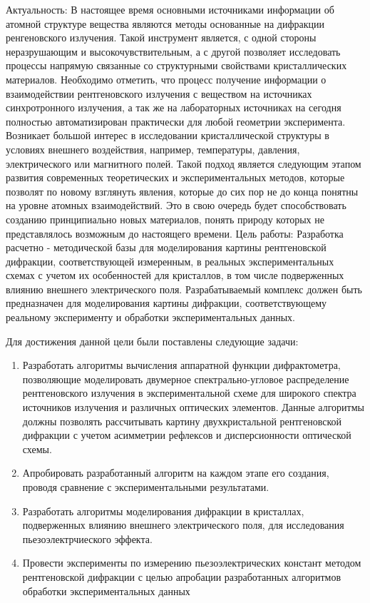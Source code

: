 
Актуальность:
  В настоящее время основными источниками информации об атомной структуре
  вещества являются методы основанные на дифракции ренгеновского излучения.
  Такой инструмент является, с одной стороны неразрушающим и высокочувствительным,
   а с другой позволяет исследовать процессы напрямую связанные со структурными
   свойствами кристаллических материалов. Необходимо отметить, что процесс
   получение информации о взаимодействии рентгеновского излучения с веществом на
   источниках синхротронного излучения, а так же на лабораторных источниках на
   сегодня полностью автоматизирован практически для любой геометрии эксперимента.
    Возникает большой интерес в исследовании кристаллической структуры в условиях
     внешнего воздействия, например, температуры, давления, электрического или
     магнитного полей.  Такой подход является следующим этапом развития современных
     теоретических и экспериментальных методов, которые позволят по новому взглянуть
     явления, которые до сих пор не до конца понятны на уровне атомных взаимодействий.
      Это в свою очередь будет способствовать созданию принципиально новых материалов,
       понять природу которых не представлялось возможным до настоящего времени.
Цель работы:
  Разработка расчетно - методической базы для моделирования картины рентгеновской
  дифракции, соответствующей измеренным, в реальных экспериментальных схемах
  с учетом их особенностей для кристаллов, в том числе подверженных влиянию
  внешнего электрического поля. Разрабатываемый комплекс должен быть предназначен
  для моделирования картины дифракции, соответствующему реальному эксперименту
  и обработки экспериментальных данных.

Для достижения данной цели были поставлены следующие задачи:
\begin{enumerate}
\item Разработать алгоритмы вычисления аппаратной функции дифрактометра, позволяющие моделировать
двумерное спектрально-угловое распределение рентгеновского излучения в экспериментальной схеме
для широкого спектра источников излучения и различных оптических элементов.
Данные алгоритмы должны позволять рассчитывать картину двухкристальной рентгеновской дифракции с учетом
асимметрии рефлексов и дисперсионности оптической схемы.

\item Апробировать разработанный алгоритм на каждом этапе его создания,
проводя сравнение с экспериментальными результатами.

\item  Разработать алгоритмы моделирования дифракции в кристаллах, подверженных
влиянию внешнего электрического поля, для исследования пьезоэлектрчиеского эффекта.

\item Провести эксперименты по измерению пьезоэлектрических констант
методом рентгеновской дифракции с целью апробации разработанных алгоритмов
обработки экспериментальных данных
\end{enumerate}

%
